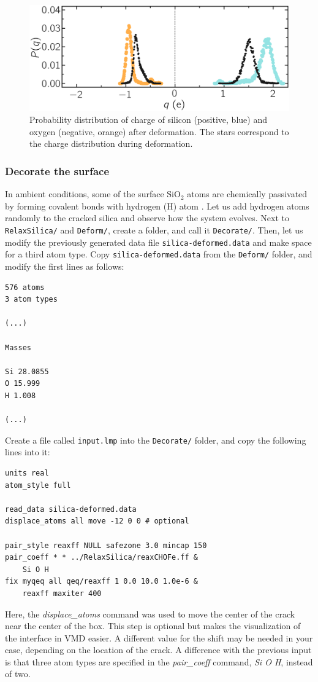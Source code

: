 \documentclass[9pt,tutorial]{livecoms}
\newcommand{\flrcmd}[1]{\textcolor{command}{\texttt{#1}}} %
\newcommand{\flecmd}[1]{\textcolor{command}{\texttt{#1}}} %
\begin{document}
\begin{figure}
\includegraphics[width=\linewidth]{SIO-distribution-bis}
\caption{Probability distribution of charge of silicon (positive, blue) and oxygen
(negative, orange) after deformation. The stars correspond to the charge distribution
during deformation.}
\label{fig:SIO-distribution-bis}
\end{figure}

\subsubsection{Decorate the surface}
In ambient conditions, some of the surface $\text{SiO}_2$ atoms are chemically
passivated by forming covalent bonds with hydrogen (H) atom \cite{sulpizi2012silica}.
Let us add hydrogen atoms randomly to the cracked silica and observe how the
system evolves.  Next to \flrcmd{RelaxSilica/} and \flrcmd{Deform/}, create a folder,
and call it \flrcmd{Decorate/}. Then, let us modify the previously generated data
file \flecmd{silica-deformed.data} and make space for a third atom type.
Copy \flecmd{silica-deformed.data} from the \flrcmd{Deform/} folder, and modify
the first lines as follows:
\begin{lstlisting}
576 atoms
3 atom types

(...)

Masses

Si 28.0855
O 15.999
H 1.008

(...)
\end{lstlisting}
Create a file called \flecmd{input.lmp} into the \flrcmd{Decorate/} folder, and
copy the following lines into it:
\begin{lstlisting}
units real
atom_style full

read_data silica-deformed.data
displace_atoms all move -12 0 0 # optional

pair_style reaxff NULL safezone 3.0 mincap 150
pair_coeff * * ../RelaxSilica/reaxCHOFe.ff &
    Si O H
fix myqeq all qeq/reaxff 1 0.0 10.0 1.0e-6 &
    reaxff maxiter 400
\end{lstlisting}
Here, the \textit{displace\_atoms} command was used to move the center of the
crack near the center of the box. This step is optional but makes the visualization
of the interface in VMD easier. A different value for the shift may be needed in
your case, depending on the location of the crack. A difference with the previous
input is that three atom types are specified in the \textit{pair\_coeff} command,
\textit{Si O H}, instead of two.
\end{document}
